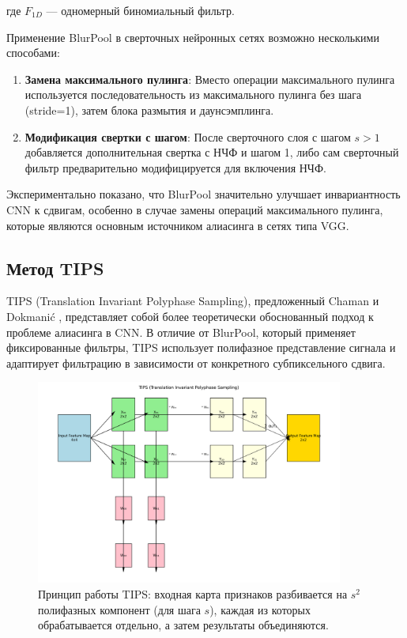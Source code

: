 где $F_{1D}$ — одномерный биномиальный фильтр.

Применение BlurPool в сверточных нейронных сетях возможно несколькими способами:

\begin{enumerate}
    \item \textbf{Замена максимального пулинга}: Вместо операции максимального пулинга используется последовательность из максимального пулинга без шага (stride=1), затем блока размытия и даунсэмплинга.
    
    \item \textbf{Модификация свертки с шагом}: После сверточного слоя с шагом $s > 1$ добавляется дополнительная свертка с НЧФ и шагом 1, либо сам сверточный фильтр предварительно модифицируется для включения НЧФ.
\end{enumerate}

Экспериментально показано, что BlurPool значительно улучшает инвариантность CNN к сдвигам, особенно в случае замены операций максимального пулинга, которые являются основным источником алиасинга в сетях типа VGG.

\subsection{Метод TIPS}
\label{theory:anti_aliasing:tips}

TIPS (Translation Invariant Polyphase Sampling), предложенный Chaman и Dokmanić \cite{Chaman2021}, представляет собой более теоретически обоснованный подход к проблеме алиасинга в CNN. В отличие от BlurPool, который применяет фиксированные фильтры, TIPS использует полифазное представление сигнала и адаптирует фильтрацию в зависимости от конкретного субпиксельного сдвига.

\begin{figure}[ht]
\centering
\includegraphics[width=0.9\textwidth]{Dissertation/images/tips_illustration.png}
\caption{Принцип работы TIPS: входная карта признаков разбивается на $s^2$ полифазных компонент (для шага $s$), каждая из которых обрабатывается отдельно, а затем результаты объединяются.}
\label{fig:tips_illustration}
\end{figure}

